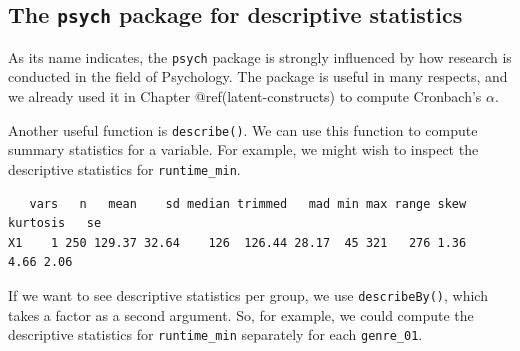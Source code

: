 \documentclass[
  letterpaper,
]{krantz}
\makeatletter
\newenvironment{Shaded}{\begin{snugshade}}{\end{snugshade}}
\newcommand{\CommentTok}[1]{\textcolor[rgb]{0.37,0.37,0.37}{#1}}
\newcommand{\DecValTok}[1]{\textcolor[rgb]{0.68,0.00,0.00}{#1}}
\newcommand{\FunctionTok}[1]{\textcolor[rgb]{0.28,0.35,0.67}{#1}}
\newcommand{\NormalTok}[1]{\textcolor[rgb]{0.00,0.23,0.31}{#1}}
\newcommand{\OtherTok}[1]{\textcolor[rgb]{0.00,0.23,0.31}{#1}}
\newcommand{\SpecialCharTok}[1]{\textcolor[rgb]{0.37,0.37,0.37}{#1}}
\newenvironment{kframe}{%
\medskip{}
\setlength{\fboxsep}{.8em}
 \def\at@end@of@kframe{}%
 \ifinner\ifhmode%
  \def\at@end@of@kframe{\end{minipage}}%
  \begin{minipage}{\columnwidth}%
 \fi\fi%
 \def\FrameCommand##1{\hskip\@totalleftmargin \hskip-\fboxsep
 \colorbox{shadecolor}{##1}\hskip-\fboxsep
     \hskip-\linewidth \hskip-\@totalleftmargin \hskip\columnwidth}%
 \MakeFramed {\advance\hsize-\width
   \@totalleftmargin\z@ \linewidth\hsize
   \@setminipage}}%
 {\par\unskip\endMakeFramed%
 \at@end@of@kframe}
\renewenvironment{Shaded}{\begin{kframe}}{\end{kframe}}
\makeatother
\begin{document}
\subsection{\texorpdfstring{The \texttt{psych} package for descriptive
statistics}{The psych package for descriptive statistics}}\label{the-psych-package-for-descriptive-statistics}

As its name indicates, the \texttt{psych} package is strongly influenced
by how research is conducted in the field of Psychology. The package is
useful in many respects, and we already used it in Chapter
@ref(latent-constructs) to compute Cronbach's \(\alpha\).

Another useful function is \texttt{describe()}. We can use this function
to compute summary statistics for a variable. For example, we might wish
to inspect the descriptive statistics for \texttt{runtime\_min}.

\begin{Shaded}
\end{Shaded}

\begin{verbatim}
   vars   n   mean    sd median trimmed   mad min max range skew kurtosis   se
X1    1 250 129.37 32.64    126  126.44 28.17  45 321   276 1.36     4.66 2.06
\end{verbatim}

If we want to see descriptive statistics per group, we use
\texttt{describeBy()}, which takes a factor as a second argument. So,
for example, we could compute the descriptive statistics for
\texttt{runtime\_min} separately for each \texttt{genre\_01}.

\begin{Shaded}
\end{Shaded}
\end{document}
